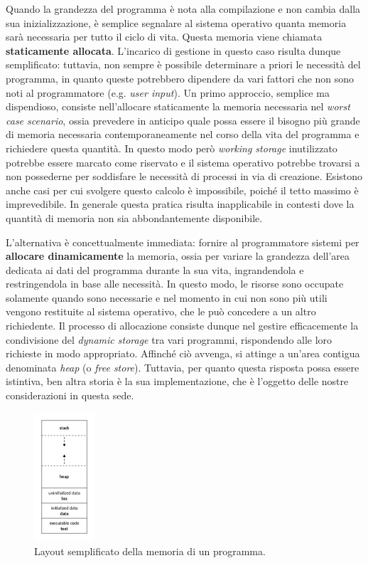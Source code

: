 Quando la grandezza del programma è nota alla compilazione e non cambia dalla sua inizializzazione, è semplice segnalare al sistema operativo quanta memoria sarà necessaria per tutto il ciclo di vita. Questa memoria viene chiamata \textbf{staticamente allocata}. L'incarico di gestione in questo caso risulta dunque semplificato: tuttavia, non sempre è possibile determinare a priori le necessità del programma, in quanto queste potrebbero dipendere da vari fattori che non sono noti al programmatore (e.g. \textit{user input}). Un primo approccio, semplice ma dispendioso, consiste nell'allocare staticamente la memoria necessaria nel \textit{worst case scenario}, ossia prevedere in anticipo quale possa essere il bisogno più grande di memoria necessaria contemporaneamente nel corso della vita del programma e richiedere questa quantità. In questo modo però \textit{working storage} inutilizzato potrebbe essere marcato come riservato e il sistema operativo potrebbe trovarsi a non possederne per soddisfare le necessità di processi in via di creazione\footnotemark. Esistono anche casi per cui svolgere questo calcolo è impossibile, poiché il tetto massimo è imprevedibile. In generale questa pratica risulta inapplicabile in contesti dove la quantità di memoria non sia abbondantemente disponibile.


L'alternativa è concettualmente immediata: fornire al programmatore sistemi per \textbf{allocare dinamicamente} la memoria, ossia per variare la grandezza dell'area dedicata ai dati del programma durante la sua vita, ingrandendola e restringendola in base alle necessità. In questo modo, le risorse sono occupate solamente quando sono necessarie e nel momento in cui non sono più utili vengono restituite al sistema operativo, che le può concedere a un altro richiedente. Il processo di allocazione consiste dunque nel gestire efficacemente la condivisione del \textit{dynamic storage} tra vari programmi, rispondendo alle loro richieste in modo appropriato. Affinché ciò avvenga, si attinge a un'area contigua denominata \textit{heap} (o \textit{free store}). Tuttavia, per quanto questa risposta possa essere istintiva, ben altra storia è la sua implementazione, che è l'oggetto delle nostre considerazioni in questa sede. 

\begin{figure}[H]
  \centering
  \includegraphics[width=0.2\textwidth]{images/program_memory_layout.png}
  \caption{Layout semplificato della memoria di un programma.}
  \label{fig:program_memory_layout}
\end{figure}

